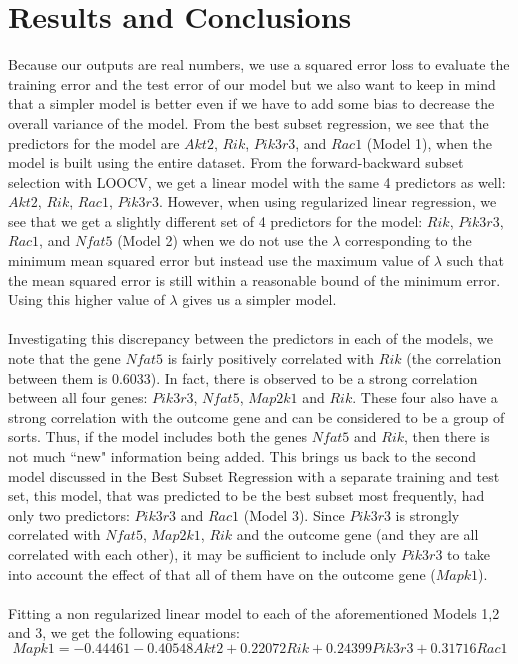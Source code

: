 \documentclass{article}
\begin{document}
\section{Results and Conclusions}
Because our outputs are real numbers, we use a squared error loss to evaluate the training error and the test error of our model but we also want to keep in mind that a simpler model is better even if we have to add some bias to decrease the overall variance of the model.  From the best subset regression, we see that the predictors for the model are $Akt2$, $Rik$, $Pik3r3$, and $Rac1$ (Model 1), when the model is built using the entire dataset. From the forward-backward subset selection with LOOCV, we get a linear model with the same 4 predictors as well: $Akt2$, $Rik$, $Rac1$, $Pik3r3$.  However, when using regularized linear regression, we see that we get a slightly different set of 4 predictors for the model: $Rik$, $Pik3r3$, $Rac1$, and $Nfat5$ (Model 2) when we do not use the $\lambda$ corresponding to the minimum mean squared error but instead use the maximum value of $\lambda$ such that the mean squared error is still within a reasonable bound of the minimum error.  Using this higher value of $\lambda$ gives us a simpler model. \\
\null\\
Investigating this discrepancy between the predictors in each of the models, we note that the gene $Nfat5$ is fairly positively correlated with $Rik$ (the correlation between them is 0.6033). In fact, there is observed to be a strong correlation between all four genes: $Pik3r3$, $Nfat5$, $Map2k1$ and $Rik$. These four also have a strong correlation with the outcome gene and can be considered to be a group of sorts. Thus, if the model includes both the genes $Nfat5$ and $Rik$, then there is not much ``new" information being added. This brings us back to the second model discussed in the Best Subset Regression with a separate training and test set, this model, that was predicted to be the best subset most frequently, had only two predictors: $Pik3r3$ and $Rac1$ (Model 3). Since $Pik3r3$ is strongly correlated with $Nfat5$, $Map2k1$, $Rik$ and the outcome gene (and they are all correlated with each other), it may be sufficient to include only $Pik3r3$ to take into account the effect of that all of them have on the outcome gene ($Mapk1$).  \\
\null\\
Fitting a non regularized linear model to each of the aforementioned Models 1,2 and 3, we get the following equations:
\begin{equation}
	Mapk1 = -0.44461-0.40548Akt2+0.22072Rik+0.24399Pik3r3+0.31716Rac1
	\label{eq:Model1}
\end{equation}
\end{document}
